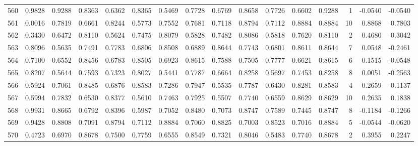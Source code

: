 \begin{tabular}{lrrrrrrrrrrrrrrr}
560 &      0.9828 &  0.9288 &  0.8363 &  0.6362 &  0.8365 &  0.5469 &  0.7728 &  0.6769 &  0.8658 &  0.7726 &   0.6602 &     0.9288 &      1 &                   -0.0540 &                    -0.0540 \\
561 &      0.0016 &  0.7819 &  0.6661 &  0.8244 &  0.5773 &  0.7552 &  0.7681 &  0.7118 &  0.8794 &  0.7112 &   0.8884 &     0.8884 &     10 &                    0.8868 &                     0.7803 \\
562 &      0.3430 &  0.6472 &  0.8110 &  0.5624 &  0.7475 &  0.8079 &  0.5828 &  0.7482 &  0.8086 &  0.5818 &   0.7620 &     0.8110 &      2 &                    0.4680 &                     0.3042 \\
563 &      0.8096 &  0.5635 &  0.7491 &  0.7783 &  0.6806 &  0.8508 &  0.6889 &  0.8644 &  0.7743 &  0.6801 &   0.8611 &     0.8644 &      7 &                    0.0548 &                    -0.2461 \\
564 &      0.7100 &  0.6552 &  0.8456 &  0.6783 &  0.8505 &  0.6923 &  0.8615 &  0.7588 &  0.7505 &  0.7777 &   0.6621 &     0.8615 &      6 &                    0.1515 &                    -0.0548 \\
565 &      0.8207 &  0.5644 &  0.7593 &  0.7323 &  0.8027 &  0.5441 &  0.7787 &  0.6664 &  0.8258 &  0.5697 &   0.7453 &     0.8258 &      8 &                    0.0051 &                    -0.2563 \\
566 &      0.5924 &  0.7061 &  0.8485 &  0.6876 &  0.8583 &  0.7286 &  0.7947 &  0.5535 &  0.7787 &  0.6430 &   0.8281 &     0.8583 &      4 &                    0.2659 &                     0.1137 \\
567 &      0.5994 &  0.7832 &  0.6530 &  0.8377 &  0.5610 &  0.7463 &  0.7925 &  0.5507 &  0.7740 &  0.6559 &   0.8629 &     0.8629 &     10 &                    0.2635 &                     0.1838 \\
568 &      0.9931 &  0.8665 &  0.6792 &  0.8396 &  0.5987 &  0.7052 &  0.8480 &  0.7073 &  0.8747 &  0.7589 &   0.7445 &     0.8747 &      8 &                   -0.1184 &                    -0.1266 \\
569 &      0.9428 &  0.8808 &  0.7091 &  0.8794 &  0.7112 &  0.8884 &  0.7060 &  0.8825 &  0.7003 &  0.8523 &   0.7016 &     0.8884 &      5 &                   -0.0544 &                    -0.0620 \\
570 &      0.4723 &  0.6970 &  0.8678 &  0.7500 &  0.7759 &  0.6555 &  0.8549 &  0.7321 &  0.8046 &  0.5483 &   0.7740 &     0.8678 &      2 &                    0.3955 &                     0.2247 \\

\end{tabular}
